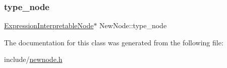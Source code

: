 \subsubsection{\texorpdfstring{type\+\_\+node}{type\_node}}
{\footnotesize\ttfamily \hyperlink{classExpressionInterpretableNode}{Expression\+Interpretable\+Node}$\ast$ New\+Node\+::type\+\_\+node}



The documentation for this class was generated from the following file\+:\begin{DoxyCompactItemize}
\item 
include/\hyperlink{newnode_8h}{newnode.\+h}\end{DoxyCompactItemize}
